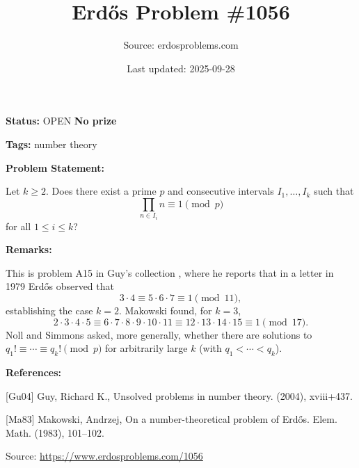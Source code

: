 \documentclass{article}
\title{Erd\H{o}s Problem \#1056}
\date{Last updated: 2025-09-28}
\author{Source: erdosproblems.com}
\begin{document}
\maketitle

\noindent\textbf{Status:} OPEN \quad \textbf{No prize}

\noindent\textbf{Tags:} number theory

\medskip
\noindent\textbf{Problem Statement:}

Let $k\geq 2$. Does there exist a prime $p$ and consecutive intervals $I_1,\ldots,I_k$ such that\[\prod_{n\in I_i}n \equiv 1\pmod{p}\]for all $1\leq i\leq k$?

\bigskip
\noindent\textbf{Remarks:}

This is problem A15 in Guy's collection \cite{Gu04}, where he reports that in a letter in 1979 Erd\H{o}s observed that\[3\cdot 4\equiv 5\cdot 6\cdot 7\equiv 1\pmod{11},\]establishing the case $k=2$. Makowski \cite{Ma83} found, for $k=3$,\[2\cdot 3\cdot 4\cdot 5\equiv 6\cdot 7\cdot 8\cdot 9\cdot 10\cdot 11\equiv 12\cdot 13\cdot 14\cdot 15\equiv 1\pmod{17}.\]Noll and Simmons asked, more generally, whether there are solutions to $q_1!\equiv\cdots \equiv q_k!\pmod{p}$ for arbitrarily large $k$ (with $q_1<\cdots<q_k$).

\bigskip
\noindent\textbf{References:}

[Gu04] Guy, Richard K., Unsolved problems in number theory. (2004), xviii+437.
 
 [Ma83] M\polhk akowski, Andrzej, On a number-theoretical problem of {E}rd\H{o}s. Elem. Math. (1983), 101--102.

\bigskip
\noindent\small{Source: \url{https://www.erdosproblems.com/1056}}
\end{document}
